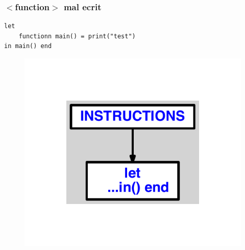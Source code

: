 \documentclass{article}
\begin{document}
\subsubsection{$ < $function$ > $ mal ecrit}
\begin{lstlisting}
let
	functionn main() = print("test")
in main() end
\end{lstlisting}
\newpage
\begin{figure}[H]
\centering
\includegraphics[max width=\textwidth]{ast/ast_226.pdf}
\end{figure}
\newpage
\end{document}
